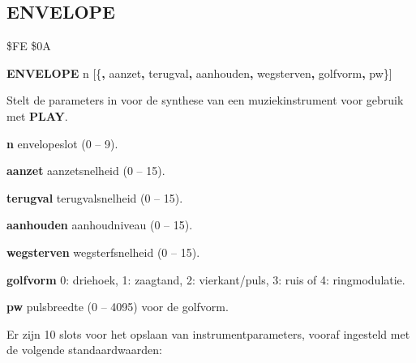 
\newpage
\subsection{ENVELOPE}
\begin{description}[leftmargin=2cm,style=nextline]
\item [Token:]    \$FE \$0A

\item [Formaat:]   {\bf ENVELOPE} n [\{{\bf,} aanzet{\bf,} terugval{\bf,} aanhouden{\bf,} wegsterven{\bf,} golfvorm{\bf,} pw\}]

\item [Gebruik:]    Stelt de parameters in voor de synthese van een muziekinstrument voor gebruik met {\bf PLAY}.

                  {\bf n} envelopeslot (0 -- 9).

                  {\bf aanzet} aanzetsnelheid (0 -- 15).

                  {\bf terugval} terugvalsnelheid (0 -- 15).

                  {\bf aanhouden} aanhoudniveau (0 -- 15).

                  {\bf wegsterven} wegsterfsnelheid (0 -- 15).

                  {\bf golfvorm} 0: driehoek, 1: zaagtand, 2: vierkant/puls, 3: ruis of 4: ringmodulatie.

                  {\bf pw} pulsbreedte (0 -- 4095) voor de golfvorm.

                  \label{envelopetable}
                  Er zijn 10 slots voor het opslaan van instrumentparameters, vooraf ingesteld met de volgende standaardwaarden:


\end{description}
